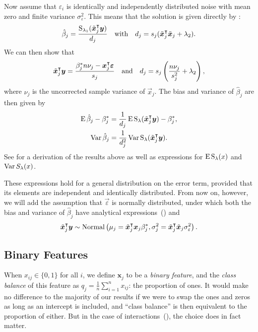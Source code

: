 Now assume that \(\varepsilon_i\) is identically and independently distributed noise with
mean zero and finite variance \(\sigma_\varepsilon^2\). This means that the solution is
given directly by :
\[
  \hat{\beta}_j = \frac{\operatorname{S}_{\lambda_1}(\tilde{\bm{x}}_j^\intercal \bm{y})}{d_j}\quad\text{with}\quad d_j = s_j(\tilde{\bm{x}}_j^\intercal \tilde{\bm{x}}_j + \lambda_2).
\]
We can then show that
\begin{equation}
  \label{eq:z-d}
  \tilde{\bm{x}}_j^\intercal \bm{y} = \frac{\beta_j^* n \nu_j- \bm{x}_j^\intercal \bm{\varepsilon}}{s_j}
  \quad\text{and}\quad
  d_j = s_j\left(\frac{n \nu_j}{s_j^2} + \lambda_2\right),
\end{equation}
where \(\nu_j\) is the uncorrected sample variance of \(\vec{x}_j\).
The bias and variance of \(\hat{\beta}_j\) are then given by
\begin{align}
  \operatorname{E} \hat\beta_j - \beta_j^* & = \frac{1}{d_j}\operatorname{E} \operatorname{S}_\lambda(\tilde{\bm{x}}_j^\intercal \bm{y}) - \beta^*_j,\label{eq:bias} \\
  \operatorname{Var} \hat\beta_j           & = \frac{1}{d_j^2} \operatorname{Var} \operatorname{S}_\lambda(\tilde{\bm{x}}_j^\intercal \bm{y}).\label{eq:variance}
\end{align}
See  for a derivation of the results above
as well as expressions for \(\operatorname{E} \operatorname{S}_\lambda(x)\) and \(\operatorname{Var} S_\lambda(x)\).

These expressions hold for a general distribution on the error term, provided that its
elements are independent and identically distributed. From now on, however, we will add the
assumption that \(\vec{\varepsilon}\) is normally distributed, under which both the bias
and variance of \(\hat{\beta}_j\) have analytical
expressions~() and
\[
  \tilde{\bm{x}}_j^\intercal \bm{y} \sim \operatorname{Normal}\left(\mu_j = \tilde{\bm{x}}_j^\intercal\bm{x}_j \beta_j^*, \sigma_j^2 = \tilde{\bm{x}}_j^\intercal\tilde{\bm{x}}_j \sigma_\varepsilon^2 \right).
\]

\subsection{Binary Features}%
\label{sec:theory-binary-features}

When \(x_{ij} \in \{0, 1\}\) for all \(i\), we define \(\bm{x}_j\) to be a \emph{binary
  feature}, and the \emph{class balance} of this feature as \(q_j =
\frac{1}{n}\sum_{i=1}^n{x_{ij}}\): the proportion of ones. It would make no difference to
the majority of our results if we were to swap the ones and zeros as long as an intercept
is included, and ``class balance'' is then equivalent to the proportion of either. But in
the case of interactions~(), the choice does in fact matter.

